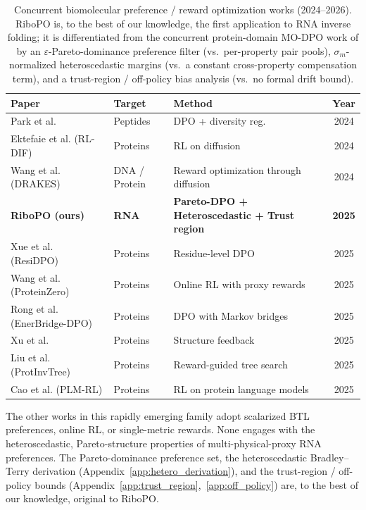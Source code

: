 {{\begin{table}[h]
\centering
\caption{Concurrent biomolecular preference / reward optimization works (2024--2026). RiboPO is, to the best of our knowledge, the first application to RNA inverse folding; it is differentiated from the concurrent protein-domain MO-DPO work of \citet{hou2026protalign} by an $\varepsilon$-Pareto-dominance preference filter (vs.\ per-property pair pools), $\sigma_m$-normalized heteroscedastic margins (vs.\ a constant cross-property compensation term), and a trust-region / off-policy bias analysis (vs.\ no formal drift bound).}
\label{tab:concurrent_works}
\small
\begin{tabular}{lllc}
\toprule
\textbf{Paper} & \textbf{Target} & \textbf{Method} & \textbf{Year} \\
\midrule
Park et al. & Peptides & DPO + diversity reg. & 2024 \\
Ektefaie et al. (RL-DIF) & Proteins & RL on diffusion & 2024 \\
Wang et al. (DRAKES) & DNA / Protein & Reward optimization through diffusion & 2024 \\
\textbf{RiboPO (ours)} & \textbf{RNA} & \textbf{Pareto-DPO + Heteroscedastic + Trust region} & \textbf{2025} \\
Xue et al. (ResiDPO) & Proteins & Residue-level DPO & 2025 \\
Wang et al. (ProteinZero) & Proteins & Online RL with proxy rewards & 2025 \\
Rong et al. (EnerBridge-DPO) & Proteins & DPO with Markov bridges & 2025 \\
Xu et al. & Proteins & Structure feedback & 2025 \\
Liu et al. (ProtInvTree) & Proteins & Reward-guided tree search & 2025 \\
Cao et al. (PLM-RL) & Proteins & RL on protein language models & 2025 \\
\bottomrule
\end{tabular}
\end{table}

The other works in this rapidly emerging family adopt scalarized BTL preferences, online RL, or single-metric rewards. None engages with the heteroscedastic, Pareto-structure properties of multi-physical-proxy RNA preferences. The Pareto-dominance preference set, the heteroscedastic Bradley--Terry derivation (Appendix~\ref{app:hetero_derivation}), and the trust-region / off-policy bounds (Appendix~\ref{app:trust_region},~\ref{app:off_policy}) are, to the best of our knowledge, original to RiboPO.






























}}

